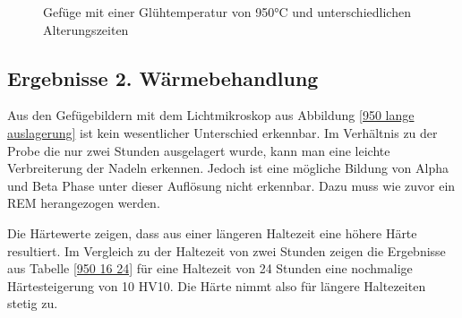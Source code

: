 \documentclass[a4paper, 11pt]{tubsreprt}
\begin{document}
\begin{figure} %
    \caption{Gefüge mit einer Glühtemperatur von 950°C und unterschiedlichen Alterungszeiten}
    \label{Glühung950+alterung}
\end{figure}
\subsection{Ergebnisse 2. Wärmebehandlung}
Aus den Gefügebildern mit dem Lichtmikroskop aus Abbildung \ref{950 lange auslagerung} ist kein wesentlicher Unterschied erkennbar. Im Verhältnis zu der Probe die nur zwei Stunden ausgelagert wurde, kann man eine leichte Verbreiterung der Nadeln erkennen. Jedoch ist eine mögliche Bildung von Alpha und Beta Phase unter dieser Auflösung nicht erkennbar. Dazu muss wie zuvor ein REM herangezogen werden.

Die Härtewerte zeigen, dass aus einer längeren Haltezeit eine höhere Härte resultiert. Im Vergleich zu der Haltezeit von zwei Stunden zeigen die Ergebnisse aus Tabelle \ref{950 16 24} für eine Haltezeit von 24 Stunden eine nochmalige Härtesteigerung von 10 HV10. Die Härte nimmt also für längere Haltezeiten stetig zu. 
\end{document}
